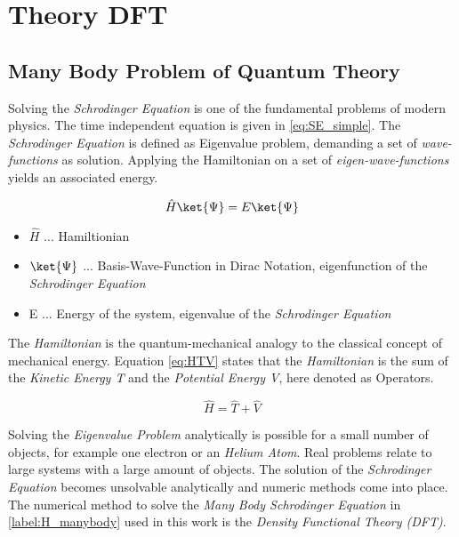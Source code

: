 \chapter{Theory DFT}
\label{chapter:2}


\section{Many Body Problem of Quantum Theory}
\label{section:2.1}

Solving the \textit{Schrodinger Equation} is one of the fundamental problems of modern physics. The time independent equation is given in \ref{eq:SE_simple}. 
The \textit{Schrodinger Equation} is defined as Eigenvalue problem, demanding a set of \textit{wave-functions} as solution. Applying the Hamiltonian on a set of \textit{eigen-wave-functions} yields an associated energy. 

\begin{equation}
	 \hat{H}\ket{\Psi} = E \ket{\Psi} 
	\label{eq:SE_simple}
\end{equation}

\begin{itemize}
	\item $ \hat{H }$ ... Hamiltionian
	\item $ \ket{\Psi} $ ... Basis-Wave-Function in Dirac Notation, eigenfunction of the \textit{Schrodinger Equation}
	\item E ... Energy of the system, eigenvalue of the \textit{Schrodinger Equation}
\end{itemize}



The \textit{Hamiltonian} is the quantum-mechanical analogy to the classical concept of mechanical energy. Equation \ref{eq:HTV} states that the \textit{Hamiltonian} is the sum of the \textit{Kinetic Energy T} and the \textit{Potential Energy V}, here denoted as Operators. 


\begin{equation}
	 \hat{H} = \hat{T}+\hat{V}
	\label{eq:HTV}
\end{equation}


Solving the \textit{Eigenvalue Problem} analytically is possible for a small number of objects, for example one electron or an \textit{Helium Atom}.
Real problems relate to large systems with a large amount of objects. The solution of the \textit{Schrodinger Equation} becomes unsolvable analytically and numeric methods come into place. The numerical method to solve the \textit{Many Body Schrodinger Equation} in \ref{label:H_manybody} used in this work is the \textit{Density Functional Theory (DFT)}. 

